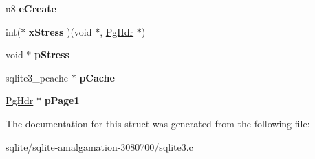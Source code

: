 \begin{DoxyCompactItemize}
\item 
\hypertarget{struct_p_cache_a28629953493154d29ab7b6485a0471bf}{u8 {\bfseries e\+Create}}\label{struct_p_cache_a28629953493154d29ab7b6485a0471bf}

\item 
\hypertarget{struct_p_cache_a8b177ebb03aaf4774b6137d48733eeb5}{int($\ast$ {\bfseries x\+Stress} )(void $\ast$, \hyperlink{struct_pg_hdr}{Pg\+Hdr} $\ast$)}\label{struct_p_cache_a8b177ebb03aaf4774b6137d48733eeb5}

\item 
\hypertarget{struct_p_cache_af04a2ea8a2c6d6b3eea7bb7051b8f447}{void $\ast$ {\bfseries p\+Stress}}\label{struct_p_cache_af04a2ea8a2c6d6b3eea7bb7051b8f447}

\item 
\hypertarget{struct_p_cache_ad0248655d30d327e0eeced6c3651b161}{sqlite3\+\_\+pcache $\ast$ {\bfseries p\+Cache}}\label{struct_p_cache_ad0248655d30d327e0eeced6c3651b161}

\item 
\hypertarget{struct_p_cache_a190ece57aafde4310e424f82998776cb}{\hyperlink{struct_pg_hdr}{Pg\+Hdr} $\ast$ {\bfseries p\+Page1}}\label{struct_p_cache_a190ece57aafde4310e424f82998776cb}

\end{DoxyCompactItemize}


The documentation for this struct was generated from the following file\+:\begin{DoxyCompactItemize}
\item 
sqlite/sqlite-\/amalgamation-\/3080700/sqlite3.\+c\end{DoxyCompactItemize}

